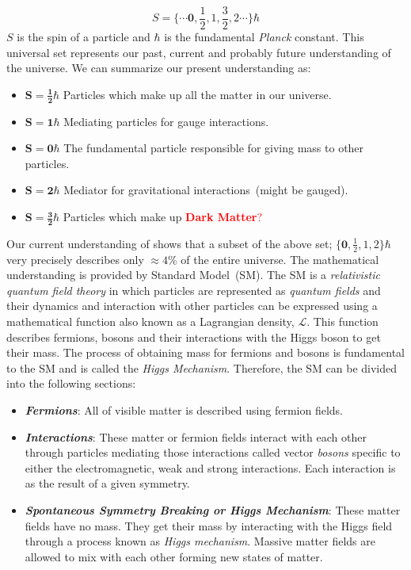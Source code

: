 \begin{equation*}
S =\{ \cdots \mathbf{0}, \frac{1}{2}, 1,  \frac{3}{2}, 2  \cdots \}\hbar 
\end{equation*}
 $S$ is the spin of a particle and $\hbar$ is the fundamental \textit{Planck} constant. 
 This universal set represents our past, current and probably future understanding of the universe. We can summarize our present understanding as:
 \begin{itemize}
  \item $\mathbf{S = \frac{1}{2}\hbar}$ Particles which make up all the matter in our universe.
  \item $\mathbf{S = 1\hbar}$ Mediating particles for gauge interactions.
  \item $\mathbf{S = 0\hbar}$ The fundamental particle responsible for giving mass to other particles.
  \item $\mathbf{S = 2\hbar}$ Mediator for gravitational interactions~(might be gauged).
  \item $\mathbf{S = \frac{3}{2}\hbar}$ Particles which make up \textcolor{red}{\textbf{Dark Matter}?}
 \end{itemize}
Our current understanding of shows that a subset of the above set; $\{\mathbf{0}, \frac{1}{2}, 1, 2 \}\hbar$ very precisely describes only $\approx 4$\% of the entire universe. The mathematical understanding is provided by Standard Model~(SM). The SM
is a \textit{relativistic quantum field theory} in which particles are represented as \textit{quantum fields} and their dynamics and interaction with other particles can be expressed using a mathematical function also known as a Lagrangian density, $\mathcal{L}$. This function describes fermions, bosons and their interactions with the Higgs boson to get their mass. The process of obtaining mass for fermions and bosons is fundamental to the SM and is called the \textit{Higgs Mechanism}.
Therefore, the SM can be  divided into the following sections:
\begin{itemize}
\item \textbf{\textit{Fermions}}: All of visible matter is described using fermion fields.
\item \textbf{\textit{Interactions}}: These matter or fermion fields interact with each other through particles mediating those interactions called vector \textit{bosons} specific to either the electromagnetic, weak and strong interactions. Each interaction is as the result of a given symmetry.
\item \textbf{\textit{Spontaneous Symmetry Breaking or Higgs Mechanism}}: These matter fields have no mass. They get their mass by interacting with the Higgs field through a process known as \textit{Higgs mechanism}. Massive matter fields are allowed to mix with each other forming new states of matter.

\end{itemize}
